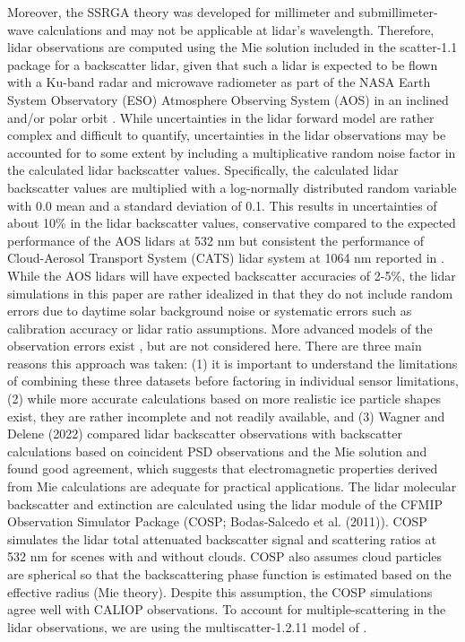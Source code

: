 \documentclass{ametsocV6.1}
\begin{document}
Moreover, the SSRGA theory was developed for millimeter and 
submillimeter-wave calculations and may not be applicable at lidar's wavelength. 
Therefore, lidar observations are computed using the Mie solution included in the scatter-1.1 
package for a backscatter lidar, given that such a lidar is expected to be flown with a 
Ku-band radar and microwave radiometer as part of the NASA Earth System Observatory 
(ESO) Atmosphere Observing System (AOS) in an inclined and/or polar orbit \citep{yorks2022}.
While uncertainties in the lidar forward model are rather complex and difficult to quantify,
uncertainties in the lidar observations may be accounted for to some extent by including a
multiplicative random noise factor in the calculated lidar backscatter values.  
Specifically, the calculated lidar backscatter values are multiplied with a log-normally distributed random variable 
with 0.0 mean and a standard deviation of 0.1. This results in uncertainties of about 10\% in the lidar backscatter values, 
conservative compared to the expected performance of the AOS lidars at 532 nm but consistent the performance of 
Cloud-Aerosol Transport System (CATS) lidar system at 1064 nm reported in \citep{pauly2019}. While the AOS lidars 
will have expected backscatter accuracies of 2-5\%, the lidar simulations in this paper are rather idealized in that 
they do not include random errors due to daytime solar background noise or systematic errors such as calibration accuracy 
or lidar ratio assumptions. More advanced models of the observation errors exist \citep{liu2006}, but are not 
considered here. There are three main reasons this approach was taken: (1) it is important to
understand the limitations of combining these three datasets before factoring in 
individual sensor limitations, (2) while more accurate calculations based on more 
realistic ice particle shapes exist, they are rather incomplete and not readily available,
and (3) Wagner and Delene (2022) compared lidar backscatter observations with backscatter 
calculations based on coincident PSD observations and the Mie solution and found good 
agreement, which suggests that electromagnetic properties derived from Mie calculations 
are adequate for practical applications. 
The lidar molecular backscatter and extinction
are calculated using the lidar module of the CFMIP Observation Simulator Package (COSP; 
Bodas-Salcedo et al. (2011)). COSP simulates the lidar total attenuated backscatter 
signal and scattering ratios at 532 nm for scenes with and without clouds. COSP also 
assumes cloud particles are spherical so that the backscattering phase function is 
estimated based on the effective radius (Mie theory). Despite this assumption, the 
COSP simulations agree well with CALIOP observations. To account for multiple-scattering 
in the lidar observations, we are using the multiscatter-1.2.11 model \citep{multiscatter-1.2.11} of 
\cite{hogan2008lidar_ms}. 
\end{document}
